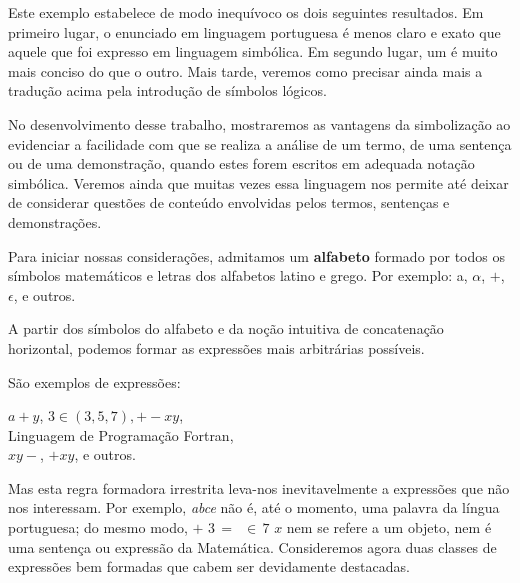     \vspace{-1\baselineskip} %

    \begin{center}
        \noindent\texttt{}
    \end{center}

\endgroup

\newpage

Este exemplo estabelece de modo inequívoco os dois seguintes resultados.
Em primeiro lugar, o enunciado em linguagem portuguesa é menos claro e exato que aquele que foi expresso em linguagem simbólica.
Em segundo lugar, um é muito mais conciso do que o outro.
Mais tarde, veremos como precisar ainda mais a tradução acima pela introdução de símbolos lógicos.

No desenvolvimento desse trabalho, mostraremos as vantagens da simbolização ao evidenciar a facilidade com que se realiza a análise de um termo, de uma sentença ou de uma demonstração, quando estes forem escritos em adequada notação simbólica.
Veremos ainda que muitas vezes essa linguagem nos permite até deixar de considerar questões de conteúdo envolvidas pelos termos, sentenças e demonstrações.

Para iniciar nossas considerações, admitamos um \textbf{alfabeto} formado por todos os símbolos matemáticos e letras dos alfabetos latino e grego.
Por exemplo: a, $\alpha$, $+$, $\epsilon$, e outros.

A partir dos símbolos do alfabeto e da noção intuitiva de concatenação horizontal, podemos formar as expressões mais arbitrárias possíveis.

São exemplos de expressões:

\vskip 1cm

\hskip 2.5cm $a + y$, $3 \in (3, 5, 7), +-xy$,\\
\hskip 2.5cm Linguagem de Programação Fortran,\\
\hskip 2.5cm $xy-$, $+xy$, e outros.

\newpage

Mas esta regra formadora irrestrita leva-nos inevitavelmente a expressões que não nos interessam.
Por exemplo, \textit{abce} não é, até o momento, uma palavra da língua portuguesa; do mesmo modo, $+\,\, 3 \,=\,\,\, \in\, 7\,\, x$ nem se refere a um objeto, nem é uma sentença ou expressão da Matemática.
Consideremos agora duas classes de expressões bem formadas que cabem ser devidamente destacadas.

